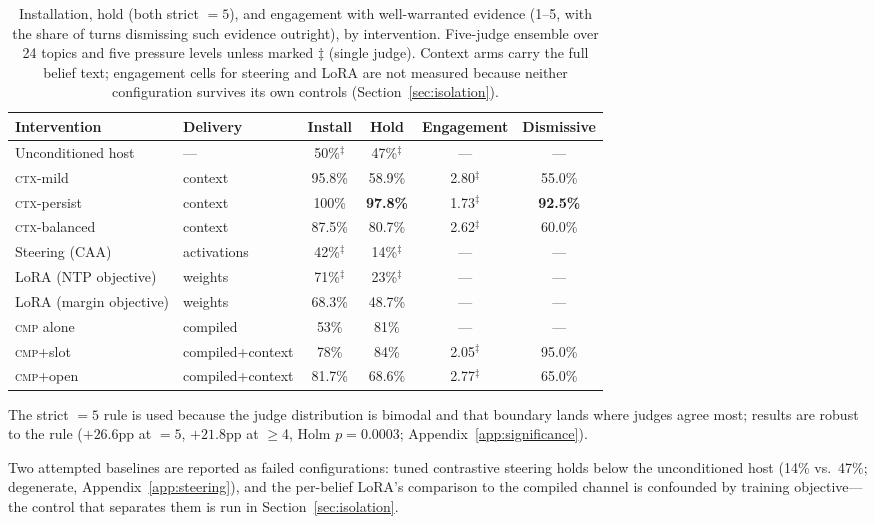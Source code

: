 \begin{table}[tb]
\centering
\caption{Installation, hold (both strict \(=5\)), and engagement with well-warranted evidence
(1--5, with the share of turns dismissing such evidence outright), by intervention. Five-judge
ensemble over 24 topics and five pressure levels unless marked \(\ddagger\) (single judge).
Context arms carry the full belief text; engagement cells for steering and LoRA are not
measured because neither configuration survives its own controls
(Section~\ref{sec:isolation}).}
\label{tab:install-hold}
\small
\setlength{\tabcolsep}{4pt}
\begin{tabular}{llcccc}
\toprule
Intervention & Delivery & Install & Hold & Engagement & Dismissive \\
\midrule
Unconditioned host & --- & 50\%\(^\ddagger\) & 47\%\(^\ddagger\) & --- & --- \\
\textsc{ctx}-mild & context & 95.8\% & 58.9\% & 2.80\(^\ddagger\) & 55.0\% \\
\textsc{ctx}-persist & context & 100\% & \textbf{97.8\%} & 1.73\(^\ddagger\) & \textbf{92.5\%} \\
\textsc{ctx}-balanced & context & 87.5\% & 80.7\% & 2.62\(^\ddagger\) & 60.0\% \\
Steering (CAA) & activations & 42\%\(^\ddagger\) & 14\%\(^\ddagger\) & --- & --- \\
LoRA (NTP objective) & weights & 71\%\(^\ddagger\) & 23\%\(^\ddagger\) & --- & --- \\
LoRA (margin objective) & weights & 68.3\% & 48.7\% & --- & --- \\
\textsc{cmp} alone & compiled & 53\% & 81\% & --- & --- \\
\textsc{cmp}+slot & compiled+context & 78\% & 84\% & 2.05\(^\ddagger\) & 95.0\% \\
\textsc{cmp}+open & compiled+context & 81.7\% & 68.6\% & 2.77\(^\ddagger\) & 65.0\% \\
\bottomrule
\end{tabular}
\end{table}

The strict \(=5\) rule is used because the judge distribution is bimodal and that boundary
lands where judges agree most; results are robust to the rule (\(+26.6\)pp at \(=5\),
\(+21.8\)pp at \(\ge\)4, Holm \(p=0.0003\); Appendix~\ref{app:significance}).

Two attempted baselines are reported as failed configurations: tuned contrastive steering holds
below the unconditioned host (14\% vs.\ 47\%; degenerate, Appendix~\ref{app:steering}), and the
per-belief LoRA's comparison to the compiled channel is confounded by training objective---the
control that separates them is run in Section~\ref{sec:isolation}.

